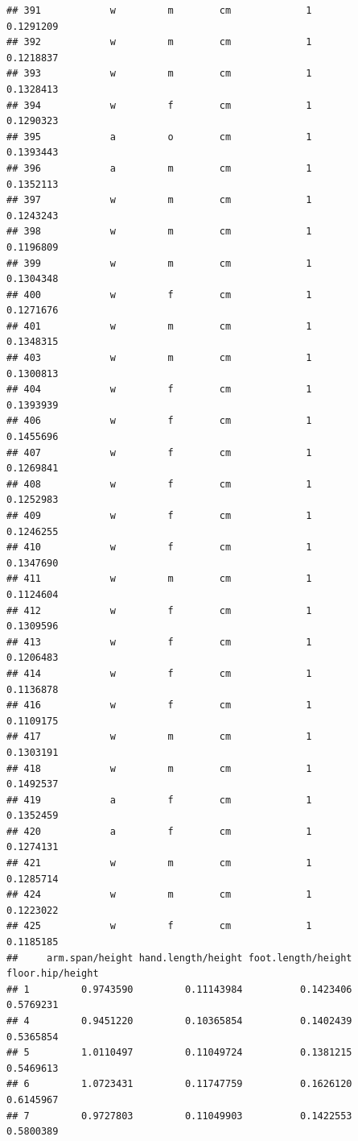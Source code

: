 \documentclass[]{article}
\begin{document}
\begin{verbatim}
## 391            w         m        cm             1          0.1291209
## 392            w         m        cm             1          0.1218837
## 393            w         m        cm             1          0.1328413
## 394            w         f        cm             1          0.1290323
## 395            a         o        cm             1          0.1393443
## 396            a         m        cm             1          0.1352113
## 397            w         m        cm             1          0.1243243
## 398            w         m        cm             1          0.1196809
## 399            w         m        cm             1          0.1304348
## 400            w         f        cm             1          0.1271676
## 401            w         m        cm             1          0.1348315
## 403            w         m        cm             1          0.1300813
## 404            w         f        cm             1          0.1393939
## 406            w         f        cm             1          0.1455696
## 407            w         f        cm             1          0.1269841
## 408            w         f        cm             1          0.1252983
## 409            w         f        cm             1          0.1246255
## 410            w         f        cm             1          0.1347690
## 411            w         m        cm             1          0.1124604
## 412            w         f        cm             1          0.1309596
## 413            w         f        cm             1          0.1206483
## 414            w         f        cm             1          0.1136878
## 416            w         f        cm             1          0.1109175
## 417            w         m        cm             1          0.1303191
## 418            w         m        cm             1          0.1492537
## 419            a         f        cm             1          0.1352459
## 420            a         f        cm             1          0.1274131
## 421            w         m        cm             1          0.1285714
## 424            w         m        cm             1          0.1223022
## 425            w         f        cm             1          0.1185185
##     arm.span/height hand.length/height foot.length/height floor.hip/height
## 1         0.9743590         0.11143984          0.1423406        0.5769231
## 4         0.9451220         0.10365854          0.1402439        0.5365854
## 5         1.0110497         0.11049724          0.1381215        0.5469613
## 6         1.0723431         0.11747759          0.1626120        0.6145967
## 7         0.9727803         0.11049903          0.1422553        0.5800389

\end{verbatim}
\end{document}
